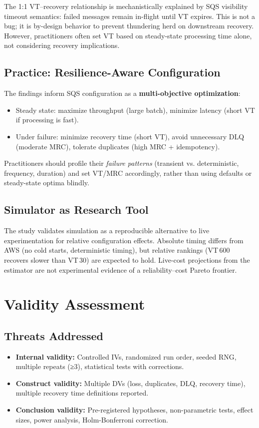 The 1:1 VT–recovery relationship is mechanistically explained by SQS visibility timeout semantics: failed messages remain in-flight until VT expires. This is not a bug; it is by-design behavior to prevent thundering herd on downstream recovery. However, practitioners often set VT based on steady-state processing time alone, not considering recovery implications.

\subsection{Practice: Resilience-Aware Configuration}

The findings inform SQS configuration as a \textbf{multi-objective optimization}:
\begin{itemize}
    \item Steady state: maximize throughput (large batch), minimize latency (short VT if processing is fast).
    \item Under failure: minimize recovery time (short VT), avoid unnecessary DLQ (moderate MRC), tolerate duplicates (high MRC + idempotency).
\end{itemize}

Practitioners should profile their \emph{failure patterns} (transient vs. deterministic, frequency, duration) and set VT/MRC accordingly, rather than using defaults or steady-state optima blindly.

\subsection{Simulator as Research Tool}

The study validates simulation as a reproducible alternative to live experimentation for relative configuration effects. Absolute timing differs from AWS (no cold starts, deterministic timing), but relative rankings (VT\,600 recovers slower than VT\,30) are expected to hold. Live-cost projections from the estimator are not experimental evidence of a reliability--cost Pareto frontier.

\section{Validity Assessment}

\subsection{Threats Addressed}

\begin{itemize}
    \item \textbf{Internal validity:} Controlled IVs, randomized run order, seeded RNG, multiple repeats (≥3), statistical tests with corrections.
    \item \textbf{Construct validity:} Multiple DVs (loss, duplicates, DLQ, recovery time), multiple recovery time definitions reported.
    \item \textbf{Conclusion validity:} Pre-registered hypotheses, non-parametric tests, effect sizes, power analysis, Holm-Bonferroni correction.
\end{itemize}

